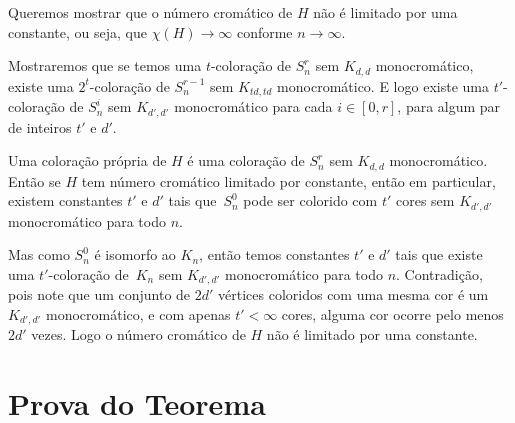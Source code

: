 
Queremos mostrar que o número cromático de $H$ não é limitado por uma constante, ou seja, que $\chi(H) \rightarrow \infty$ conforme $n \rightarrow \infty$.

Mostraremos que se temos uma $t$-coloração de $S_n^r$ sem $K_{d,d}$ monocromático, existe uma $2^t$-coloração de $S_n^{r-1}$ sem $K_{td,td}$ monocromático. E logo existe uma $t'$-coloração de $S_n^i$ sem $K_{d',d'}$ monocromático para cada $i\in [0,r]$, para algum par de inteiros $t'$ e $d'$.

Uma coloração própria de $H$ é uma coloração de $S_n^r$ sem $K_{d,d}$ monocromático. Então se $H$ tem número cromático limitado por constante, então em particular, existem constantes $t'$ e $d'$ tais que~$S_n^0$ pode ser colorido com $t'$ cores sem $K_{d',d'}$ monocromático para todo $n$.

Mas como $S_n^0$ é isomorfo ao $K_n$, então temos constantes $t'$ e $d'$ tais que existe uma $t'$-coloração de~$K_n$ sem $K_{d',d'}$ monocromático para todo $n$. Contradição, pois note que um conjunto de $2d'$ vértices coloridos com uma mesma cor é um $K_{d',d'}$ monocromático, e com apenas $t' < \infty$ cores, alguma cor ocorre pelo menos $2d'$ vezes. Logo o número cromático de $H$ não é limitado por uma constante.


\section{Prova do Teorema}


